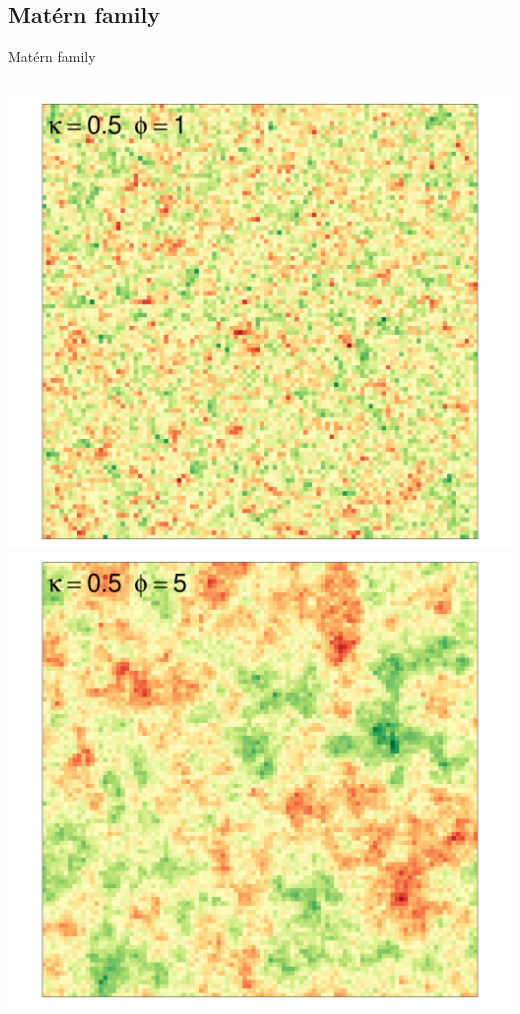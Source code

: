 \documentclass[
  ignorenonframetext,
]{beamer}
\begin{document}
\hypertarget{matuxe9rn-family-2}{%
\subsection{Matérn family}\label{matuxe9rn-family-2}}

\begin{frame}{Matérn family}
\small

\begin{columns}[T]
\begin{column}{0.33\textwidth}
\includegraphics{Lecture_1_files/figure-beamer/unnamed-chunk-27-1.pdf}
\includegraphics{Lecture_1_files/figure-beamer/unnamed-chunk-28-1.pdf}
\end{column}


\end{columns}
\end{frame}
\end{document}
